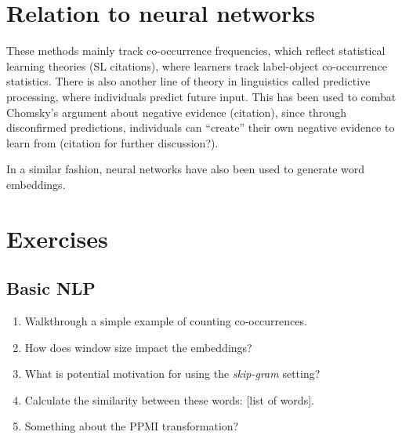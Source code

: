 
\section{Relation to neural networks}


These methods mainly track co-occurrence frequencies, which reflect statistical learning theories (SL citations), where learners track label-object co-occurrence statistics.
There is also another line of theory in linguistics called predictive processing, where individuals predict future input. This has been used to combat Chomsky's argument about negative evidence (citation), since through disconfirmed predictions, individuals can ``create'' their own negative evidence to learn from (citation for further discussion?).

In a similar fashion, neural networks have also been used to generate word embeddings.





\section{Exercises}

\subsection{Basic NLP}

\begin{enumerate}
\item Walkthrough a simple example of counting co-occurrences.
\item How does window size impact the embeddings?
\item What is potential motivation for using the \textit{skip-gram} setting?
\item Calculate the similarity between these words: [list of words]. 
\item Something about the PPMI transformation?
\end{enumerate}

